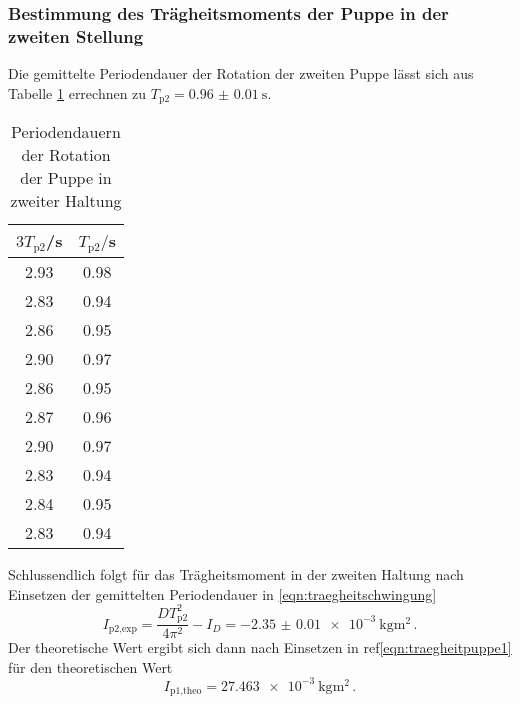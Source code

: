 \subsubsection{Bestimmung des Trägheitsmoments der Puppe in der zweiten Stellung}
Die gemittelte Periodendauer der Rotation der zweiten Puppe lässt sich aus Tabelle
\ref{tab:puppe2} errechnen zu $T_{\text{p2}}=\SI{0.96(001)}{\second}$.
\begin{table}[H]
\centering
\caption{Periodendauern der Rotation der Puppe in zweiter Haltung}
\label{tab:puppe2}
\begin{tabular}{c c}
\toprule
$3T_{\text{p2}}$/s & $T_{\text{p2}}/$s \\
\midrule
2.93 & 0.98 \\
2.83 & 0.94 \\
2.86 & 0.95 \\
2.90 & 0.97 \\
2.86 & 0.95 \\
2.87 & 0.96 \\
2.90 & 0.97 \\
2.83 & 0.94 \\
2.84 & 0.95 \\
2.83 & 0.94 \\
\bottomrule
\end{tabular}
\end{table}
Schlussendlich folgt für das Trägheitsmoment in der zweiten Haltung nach Einsetzen
der gemittelten Periodendauer in \eqref{eqn:traegheitschwingung}
\begin{equation}
  I_{\text{p2,exp}} = \frac{DT_{\text{p2}}^2}{4\pi^2}-I_D = \SI{-2.35(001)e-3}{\kilogram\meter\squared}\,.
\end{equation}
Der theoretische Wert ergibt sich dann nach Einsetzen in
ref\eqref{eqn:traegheitpuppe1} für den theoretischen Wert
\begin{equation}
  I_{\text{p1,theo}} = \SI{27.463e-3}{\kilogram\meter\squared}\,.
\end{equation}
